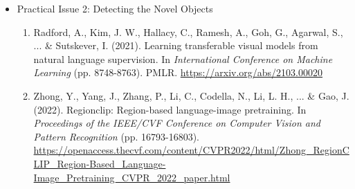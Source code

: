 \documentclass[10pt,a4paper]{article}
\begin{document}
\begin{itemize}
\item Practical Issue 2: Detecting the Novel Objects
\begin{enumerate}
\item Radford, A., Kim, J. W., Hallacy, C., Ramesh, A., Goh, G., Agarwal, S., ... \& Sutskever, I. (2021). Learning transferable visual models from natural language supervision. In \textit{International Conference on Machine Learning} (pp. 8748-8763). PMLR. \url{https://arxiv.org/abs/2103.00020}
\item Zhong, Y., Yang, J., Zhang, P., Li, C., Codella, N., Li, L. H., ... \& Gao, J. (2022). Regionclip: Region-based language-image pretraining. In \textit{Proceedings of the IEEE/CVF Conference on Computer Vision and Pattern Recognition} (pp. 16793-16803). \url{https://openaccess.thecvf.com/content/CVPR2022/html/Zhong_RegionCLIP_Region-Based_Language-Image_Pretraining_CVPR_2022_paper.html}
\end{enumerate}

\end{itemize}
\end{document}
